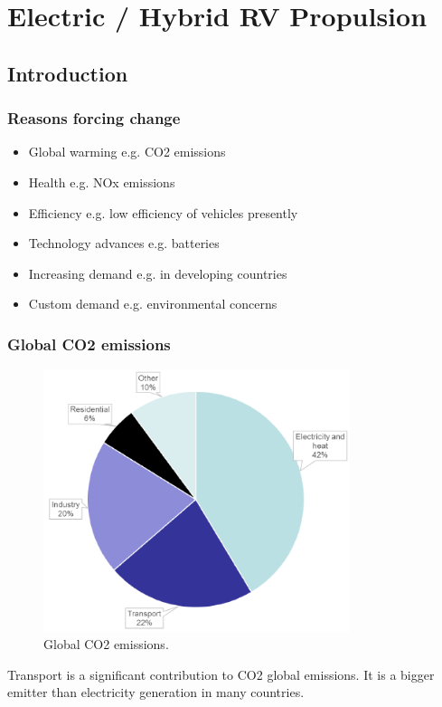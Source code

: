 \chapter{Electric / Hybrid RV Propulsion}
\section{Introduction}
\subsection{Reasons forcing change}
\begin{itemize}
    \item Global warming e.g. CO2 emissions
    \item Health e.g. NOx emissions
    \item Efficiency e.g. low efficiency of vehicles presently
    \item Technology advances e.g. batteries
    \item Increasing demand e.g. in developing countries
    \item Custom demand e.g. environmental concerns
\end{itemize}
\subsection{Global CO2 emissions}
\begin{figure}[H]
    \centering
    \includegraphics[width = 0.8\textwidth]{img/figure92.png}
    \caption{Global CO2 emissions.}
\end{figure}
Transport is a significant contribution to CO2 global emissions. It is a bigger emitter than electricity generation in many countries.
